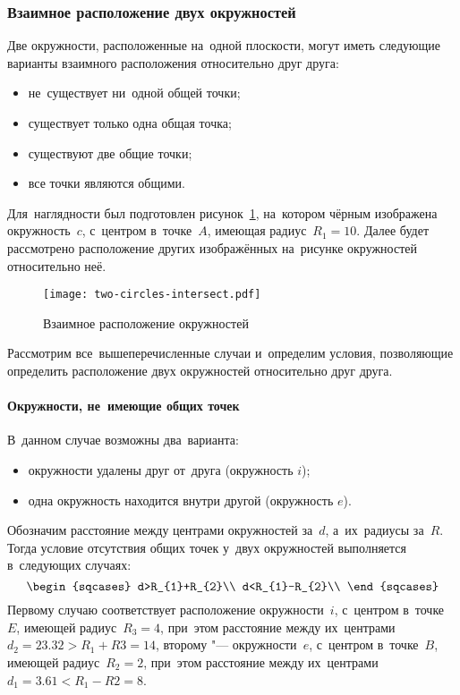 \documentclass[]{scrartcl}
\begin{document}
\subsubsection{Взаимное расположение двух окружностей}
Две окружности, расположенные на~одной плоскости, могут иметь следующие варианты взаимного расположения относительно друг друга:
\begin{itemize}
	\item не~существует ни~одной общей точки;
	\item существует только одна общая точка;
	\item существуют две общие точки;
	\item все точки являются общими.
\end{itemize}
Для~наглядности был подготовлен рисунок~\ref{fig:two-circles-intersect}, на~котором чёрным изображена окружность~${\textstyle c}$, с~центром в~точке~${\textstyle A}$, имеющая радиус~${\textstyle R_{1}=10}$. Далее будет рассмотрено расположение других изображённых на~рисунке окружностей относительно неё.
\begin{figure}[ht]
	\centering %
	\texttt{[image: two-circles-intersect.pdf]}
	\caption{Взаимное расположение окружностей}\label{fig:two-circles-intersect}
\end{figure}
Рассмотрим все~вышеперечисленные случаи и~определим условия, позволяющие определить расположение двух окружностей относительно друг друга.
\paragraph{Окружности, не~имеющие общих точек}
В~данном случае возможны два~варианта:
\begin{itemize}
	\item окружности удалены друг от~друга (окружность ${\textstyle i}$);
	\item одна окружность находится внутри другой (окружность ${\textstyle e}$).
\end{itemize}
Обозначим расстояние между центрами окружностей за~${\textstyle d}$, а~их~радиусы за~${\textstyle R}$. Тогда условие отсутствия общих точек у~двух окружностей выполняется в~следующих случаях:
\begin{equation}\label{eq:two-circles-intersect-zero-points}
	\begin{sqcases}
	d>R_{1}+R_{2}\\
	d<R_{1}-R_{2}\\
	\end{sqcases}
\end{equation}
Первому случаю соответствует расположение окружности~${\textstyle i}$, с~центром в~точке~${\textstyle E}$, имеющей радиус~${\textstyle R_{3}=4}$, при~этом расстояние между их~центрами~${\textstyle d_{2}=23.32>R_{1}+R{3}=14}$, второму "--- окружности~${\textstyle e}$, с~центром в~точке~${\textstyle B}$, имеющей радиус~${\textstyle R_{2}=2}$, при~этом расстояние между их~центрами~${\textstyle d_{1}=3.61<R_{1}-R{2}=8}$.
\end{document}
